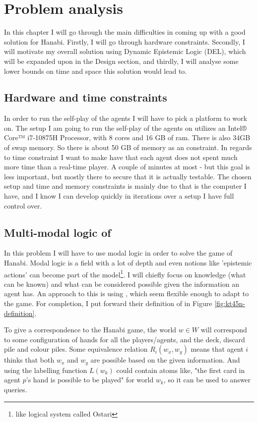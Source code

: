 \section{Problem analysis}

In this chapter I will go through the main difficulties in coming up with a good solution for Hanabi. 
Firstly, I will go through hardware constraints. 
Secondly, I will motivate my overall solution using Dynamic Epistemic Logic (DEL), which will be expanded upon in the Design section, and thirdly, I will analyse some lower bounds on time and space this solution would lead to.

\subsection{Hardware and time constraints}
In order to run the self-play of the agents I will have to pick a platform to work on.
The setup I am going to run the self-play of the agents on utilizes an Intel® Core™ i7-10875H Processor, with 8 cores and 16 GB of ram. 
There is also 34GB of swap memory. 
So there is about 50 GB of memory as an constraint.
In regards to time constraint I want to make have that each agent does not spent much more time than a real-time player. 
A couple of minutes at most - but this goal is less important, but mostly there to secure that it is actually testable.
The chosen setup and time and memory constraints is mainly due to that is the computer I have, and I know I can develop quickly in iterations over a setup I have full control over.

\subsection{Multi-modal logic of \SfiveN{}} \label{sec:definition-ktfourfiven}
In this problem I will have to use modal logic in order to solve the game of Hanabi. 
Modal logic is a field with a lot of depth and even notions like 'epistemic actions' can become part of the model\footnote{like \cite{EgerAndMartens17} logical system called Ostari}. 
I will chiefly focus on knowledge (what can be known) and what can be considered possible given the information an agent has. 
An approach to this is using \SfiveN{} \cite{HuthAndRyan2004KT45n}, which seem flexible enough to adapt to the game. 
For completion, I put forward their definition of \SfiveN{} in Figure \ref{fig:kt45n-definition}. 

To give a correspondence to the Hanabi game, the world $w \in W$ will correspond to some configuration of hands for all the players/agents, and the deck, discard pile and colour piles. 
Some equivalence relation $R_i(w_x,w_y)$ means that agent $i$ thinks that both $w_x$ and $w_y$ are possible based on the given information. 
And using the labelling function $L(w_k)$ could contain atoms like, "the first card in agent $p$'s hand is possible to be played" for world $w_k$, so it can be used to answer queries. 

